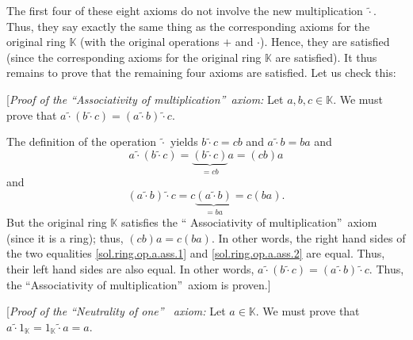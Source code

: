 \documentclass[paper=a4, fontsize=12pt]{scrartcl}%
\theoremstyle{plainsl}
\theoremstyle{definition}
\theoremstyle{remark}
\begin{document}
The first four of these eight axioms do not involve the new multiplication
$\left.  \widetilde{\cdot}\right.  $. Thus, they say exactly the same thing as
the corresponding axioms for the original ring $\mathbb{K}$ (with the original
operations $+$ and $\cdot$). Hence, they are satisfied (since the
corresponding axioms for the original ring $\mathbb{K}$ are satisfied). It
thus remains to prove that the remaining four axioms are satisfied. Let us
check this:

[\textit{Proof of the \textquotedblleft Associativity of
multiplication\textquotedblright\ axiom:} Let $a,b,c\in\mathbb{K}$. We must
prove that $a\left.  \widetilde{\cdot}\right.  \left(  b\left.
\widetilde{\cdot}\right.  c\right)  =\left(  a\left.  \widetilde{\cdot
}\right.  b\right)  \left.  \widetilde{\cdot}\right.  c$.

The definition of the operation $\left.  \widetilde{\cdot}\right.  $ yields
$b\left.  \widetilde{\cdot}\right.  c=cb$ and $a\left.  \widetilde{\cdot
}\right.  b=ba$ and%
\begin{equation}
a\left.  \widetilde{\cdot}\right.  \left(  b\left.  \widetilde{\cdot}\right.
c\right)  =\underbrace{\left(  b\left.  \widetilde{\cdot}\right.  c\right)
}_{=cb}a=\left(  cb\right)  a \label{sol.ring.op.a.ass.1}%
\end{equation}
and%
\begin{equation}
\left(  a\left.  \widetilde{\cdot}\right.  b\right)  \left.  \widetilde{\cdot
}\right.  c=c\underbrace{\left(  a\left.  \widetilde{\cdot}\right.  b\right)
}_{=ba}=c\left(  ba\right)  . \label{sol.ring.op.a.ass.2}%
\end{equation}
But the original ring $\mathbb{K}$ satisfies the \textquotedblleft
Associativity of multiplication\textquotedblright\ axiom (since it is a ring);
thus, $\left(  cb\right)  a=c\left(  ba\right)  $. In other words, the right
hand sides of the two equalities \eqref{sol.ring.op.a.ass.1} and
\eqref{sol.ring.op.a.ass.2} are equal. Thus, their left hand sides are also
equal. In other words, $a\left.  \widetilde{\cdot}\right.  \left(  b\left.
\widetilde{\cdot}\right.  c\right)  =\left(  a\left.  \widetilde{\cdot
}\right.  b\right)  \left.  \widetilde{\cdot}\right.  c$. Thus, the
\textquotedblleft Associativity of multiplication\textquotedblright\ axiom is proven.]

[\textit{Proof of the \textquotedblleft Neutrality of one\textquotedblright%
\ axiom:} Let $a\in\mathbb{K}$. We must prove that $a\left.  \widetilde{\cdot
}\right.  1_{\mathbb{K}}=1_{\mathbb{K}}\left.  \widetilde{\cdot}\right.  a=a$.
\end{document}
